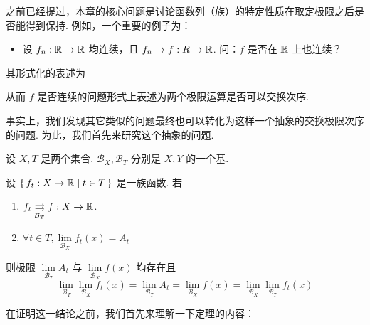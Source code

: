 
之前已经提过，本章的核心问题是讨论函数列（族）的特定性质在取定极限之后是否能得到保持. 例如，一个重要的例子为：

\begin{itemize}
    \item 设 $f_n:\mathbb{R}\to\mathbb{R}$ 均连续，且 $f_n\to f:R\to\mathbb{R}$. 问：$f$ 是否在 $\mathbb{R}$ 上也连续？
\end{itemize}

其形式化的表述为

\begin{center}
\end{center}

从而 $f$ 是否连续的问题形式上表述为两个极限运算是否可以交换次序.

事实上，我们发现其它类似的问题最终也可以转化为这样一个抽象的交换极限次序的问题. 为此，我们首先来研究这个抽象的问题.


\begin{theorem}
    设 $X,T$ 是两个集合. $\mathcal{B}_X,\mathcal{B}_T$ 分别是 $X,Y$ 的一个基.

    设 $\set{f_t:X\to\mathbb{R}|t\in T}$ 是一族函数. 若

    \begin{enumerate}
        \item\label{slcon1} $f_t\underset{\mathcal{B}_T}{\rightrightarrows}f:X\to\mathbb{R}$.
        
        \item\label{slcon2} $\forall t\in T,\lim\limits_{\mathcal{B}_X}f_t(x)=A_t$
    \end{enumerate}

    则极限 $\lim\limits_{\mathcal{B}_T}A_t$ 与 $\lim\limits_{\mathcal{B}_X}f(x)$ 均存在且
$$
\lim_{\mathcal{B}_T}\lim_{\mathcal{B}_X}f_t(x)=\lim_{\mathcal{B}_T}A_t=\lim_{\mathcal{B}_X}f(x)=\lim_{\mathcal{B}_X}\lim_{\mathcal{B}_T}f_t(x)
$$
\end{theorem}

在证明这一结论之前，我们首先来理解一下定理的内容：

